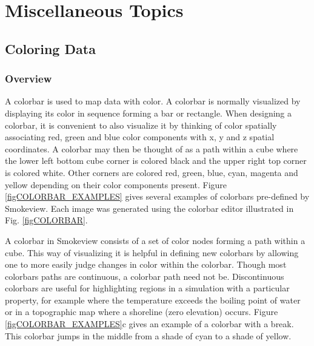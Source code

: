 \documentclass[11pt,twoside]{book}
\begin{document}
\part{Miscellaneous Topics}


\chapter{Coloring Data}
\section{Overview}
A colorbar is used to map
data with color.  A colorbar is normally visualized by
displaying its color in sequence forming a bar or rectangle.
When designing a colorbar, it is convenient to also visualize it
by thinking of color spatially associating red, green and
blue color components with x, y and z spatial coordinates.  A colorbar
may then be thought of as a path within a cube where the lower left bottom
cube corner is colored black and the upper right top corner is colored
white.  Other corners are colored red, green, blue, cyan, magenta and
yellow depending on their color components present.
Figure \ref{figCOLORBAR_EXAMPLES} gives several examples of colorbars pre-defined
by Smokeview.  Each image was generated using the colorbar editor
illustrated in Fig. \ref{figCOLORBAR}.

A colorbar in Smokeview consists of a set of color nodes forming a path
within a cube.  This way of visualizing it is helpful in defining new
colorbars by allowing one to more easily judge changes in color within the
colorbar.  Though most colorbars paths are continuous, a colorbar
path need not be.  Discontinuous colorbars
are useful for highlighting regions in a simulation with a particular
property, for example where the temperature exceeds the boiling point of
water or in a topographic map where a shoreline (zero elevation) occurs.
Figure \ref{figCOLORBAR_EXAMPLES}c
gives an example of a colorbar with a break.  This colorbar jumps in the
middle from a shade of cyan to a shade of yellow.

\end{document}
